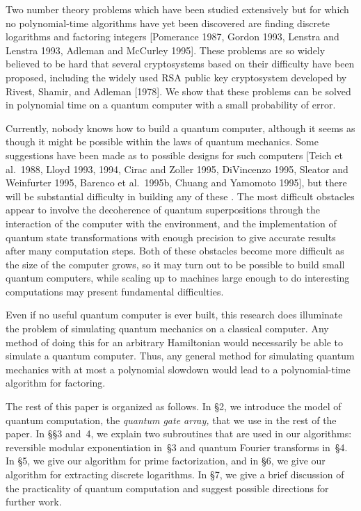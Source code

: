 Two number theory problems which have been studied extensively but 
for which no polynomial-time algorithms have yet been discovered are
finding discrete logarithms and factoring integers
[Pomerance 1987, Gordon 1993, Lenstra and Lenstra 1993, Adleman and
McCurley 1995].  These problems
are so widely believed to be hard that several cryptosystems based on their
difficulty have been proposed, including the widely used
RSA public key cryptosystem developed by Rivest, Shamir, and Adleman [1978].
We show that these 
problems can be solved in polynomial time on a quantum computer
with a small probability of error.

Currently, nobody knows how to build a quantum computer, although it seems as
though it might be possible within the laws of quantum mechanics.  
Some suggestions have been made as to possible designs for such computers
[Teich et al.\ 1988, Lloyd 1993, 1994, Cirac and Zoller 1995,
DiVincenzo 1995, Sleator and Weinfurter 1995, Barenco et al.\ 1995b,
Chuang and Yamomoto 1995], but there will 
be substantial difficulty in building any of these 
\cite{Land1,Land2,Unru,ChLaShZu,PaSuEk}.  The most difficult 
obstacles appear to involve the decoherence of quantum superpositions 
through the interaction of the computer with the environment, and 
the implementation of quantum state transformations with enough precision
to give accurate results after many computation steps.
Both of these obstacles become more difficult as the size of the
computer grows, so it may turn out to be possible to
build small quantum computers, while scaling up to machines large enough 
to do interesting computations may present fundamental difficulties.

Even if no useful quantum computer is ever built, this research does 
illuminate the problem of simulating quantum mechanics on a classical 
computer.  Any method of doing this for an arbitrary Hamiltonian would 
necessarily be able to simulate a quantum computer.
Thus, any general method for simulating quantum mechanics with at most
a polynomial slowdown would lead to a polynomial-time algorithm for 
factoring.

The rest of this paper is organized as follows.  In \S2,
we introduce the model of quantum computation, the {\em quantum gate array,}
that we use in the rest of the paper.  In \S\S3 and~4,
we explain two subroutines that are used in our algorithms: 
reversible modular exponentiation in~\S3 
and quantum Fourier transforms in~\S4.  In \S5, we give our 
algorithm for prime factorization, and
in \S6, we give our algorithm for extracting discrete
logarithms.  In \S7, we give a brief discussion of the
practicality of quantum computation and suggest possible directions for
further work.

